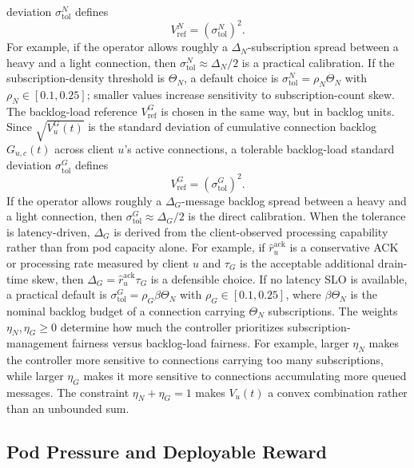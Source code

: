\documentclass[manuscript]{acmart}
\begin{document}
deviation $\sigma^{N}_{\mathrm{tol}}$ defines
\[
	V^N_{\mathrm{ref}}=(\sigma^{N}_{\mathrm{tol}})^2.
\]
For example, if the operator allows roughly a $\Delta_N$-subscription spread
between a heavy and a light connection, then
$\sigma^{N}_{\mathrm{tol}}\approx \Delta_N/2$ is a practical calibration. If
the subscription-density threshold is $\Theta_N$, a default choice is
$\sigma^{N}_{\mathrm{tol}}=\rho_N\Theta_N$ with
$\rho_N\in[0.1,0.25]$; smaller values increase sensitivity to
subscription-count skew.
The backlog-load reference $V^G_{\mathrm{ref}}$ is chosen in the same way,
but in backlog units. Since $\sqrt{V^G_u(t)}$ is the standard deviation of
cumulative connection backlog $G_{u,c}(t)$ across client $u$'s active
connections, a tolerable backlog-load standard deviation
$\sigma^{G}_{\mathrm{tol}}$ defines
\[
	V^G_{\mathrm{ref}}=(\sigma^{G}_{\mathrm{tol}})^2.
\]
If the operator allows roughly a $\Delta_G$-message backlog spread between a
heavy and a light connection, then
$\sigma^{G}_{\mathrm{tol}}\approx \Delta_G/2$ is the direct calibration. When
the tolerance is latency-driven, $\Delta_G$ is derived from the
client-observed processing capability rather than from pod capacity alone. For
example, if $\widehat{r}^{\mathrm{ack}}_{u}$ is a conservative ACK or processing rate
measured by client $u$ and $\tau_G$ is the acceptable additional drain-time
skew, then $\Delta_G=\widehat{r}^{\mathrm{ack}}_{u}\tau_G$ is a defensible choice. If
no latency SLO is available, a practical default is
$\sigma^{G}_{\mathrm{tol}}=\rho_G\beta\Theta_N$ with
$\rho_G\in[0.1,0.25]$, where $\beta\Theta_N$ is the nominal backlog budget of
a connection carrying $\Theta_N$ subscriptions.
The weights $\eta_N,\eta_G\geq0$ determine how much the controller prioritizes
subscription-management fairness versus backlog-load fairness. For example,
larger $\eta_N$ makes the controller more sensitive to connections carrying
too many subscriptions, while larger $\eta_G$ makes it more sensitive to
connections accumulating more queued messages. The constraint
$\eta_N+\eta_G=1$ makes $V_u(t)$ a convex combination rather than an
unbounded sum.

\subsection{Pod Pressure and Deployable Reward}
\end{document}
